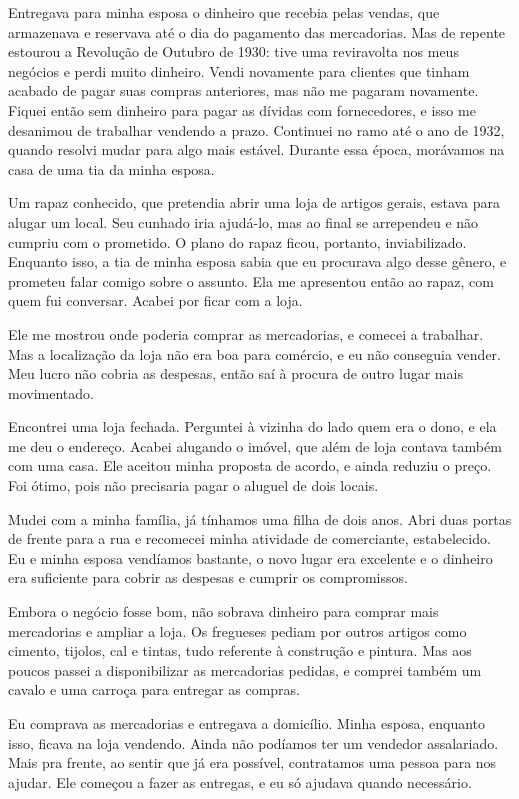 Entregava para minha esposa o dinheiro que recebia pelas vendas, que
armazenava e reservava até o dia do pagamento das mercadorias. Mas de repente estourou a
Revolução de Outubro de 1930: tive uma reviravolta nos meus negócios
e perdi muito dinheiro. Vendi novamente para clientes que tinham acabado de
pagar suas compras anteriores, mas não me pagaram novamente. Fiquei então sem
dinheiro para pagar as dívidas com fornecedores, e isso me desanimou de trabalhar vendendo a prazo.
Continuei no ramo até o ano de 1932, quando resolvi mudar para algo mais estável. Durante essa época, morávamos na casa de uma tia da minha esposa. 

Um rapaz conhecido, que pretendia abrir uma loja de artigos gerais, estava para alugar um
local. Seu cunhado iria ajudá-lo, mas ao final se arrependeu e não cumpriu com
o prometido. O plano do rapaz ficou, portanto, inviabilizado. Enquanto isso, a tia de 
minha esposa sabia que eu procurava algo desse gênero, e prometeu falar comigo sobre o assunto. 
Ela me apresentou então ao rapaz, com quem fui conversar. Acabei por ficar com a loja. 

Ele me mostrou onde poderia comprar as mercadorias, e comecei a trabalhar. 
Mas a localização da loja não era
boa para comércio, e eu não conseguia vender. Meu lucro não cobria as despesas, 
então saí à procura de outro lugar mais movimentado.

Encontrei uma loja fechada. Perguntei à vizinha do lado quem era o dono, e ela me deu o 
endereço. Acabei alugando o imóvel, que além de loja contava também com uma casa. Ele aceitou minha 
proposta de acordo, e ainda reduziu o preço. Foi ótimo, pois não precisaria pagar o aluguel de dois locais. 

Mudei com a minha família, já tínhamos uma filha de dois anos. Abri
duas portas de frente para a rua e recomecei minha atividade de
comerciante, estabelecido. Eu e minha esposa vendíamos bastante,
o novo lugar era excelente e o dinheiro era suficiente
para cobrir as despesas e cumprir os compromissos.

Embora o negócio fosse bom, não sobrava dinheiro para comprar mais
mercadorias e ampliar a loja. Os fregueses pediam por outros artigos como 
cimento, tijolos, cal e tintas, tudo referente à construção e
pintura. Mas aos poucos passei a disponibilizar as mercadorias pedidas, e
comprei também um cavalo e uma carroça para entregar as compras.

Eu comprava as mercadorias e entregava a domicílio. Minha esposa,
enquanto isso, ficava na loja vendendo. Ainda não podíamos ter um
vendedor assalariado. Mais pra frente, ao sentir que já era possível, 
contratamos uma pessoa para nos ajudar. Ele começou a fazer
as entregas, e eu só ajudava quando necessário.


